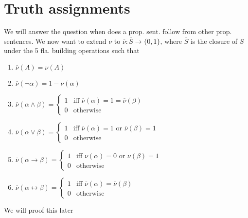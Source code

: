 \section{Truth assignments}
We will answer the question when does a prop. sent. follow from other prop. sentences.
We now want to extend $\nu$ to $\overline{\nu}: \overline{S}\to \{0,1\}$, where $\overline{S}$ is the closure of $S$ under the 5 fla. building operations such that
\begin{enumerate}
    \item $\overline{\nu}(A) = \nu(A)$
    \item $\overline{\nu}(\lnot \alpha) = 1- \nu(\alpha)$
    \item $\overline{\nu}(\alpha \land \beta) = \begin{cases}
        1 & \text{iff } \overline{\nu}(\alpha) = 1 = \overline{\nu}(\beta)\\
        0 & \text{otherwise}
    \end{cases}$
    \item $\overline{\nu}(\alpha \lor \beta) = \begin{cases}
        1 & \text{iff } \overline{\nu}(\alpha) = 1 \text{ or } \overline{\nu}(\beta) = 1\\
        0 & \text{otherwise}
    \end{cases}$
    \item $\overline{\nu}(\alpha \to \beta) = \begin{cases}
        1 & \text{iff } \overline{\nu}(\alpha) = 0 \text{ or } \overline{\nu}(\beta) = 1\\
        0 & \text{otherwise}
    \end{cases}$
    \item $\overline{\nu}(\alpha \leftrightarrow \beta) = \begin{cases}
        1 & \text{iff } \overline{\nu}(\alpha) =  \overline{\nu}(\beta)\\
        0 & \text{otherwise}
    \end{cases}$
\end{enumerate}
    We will proof this later
